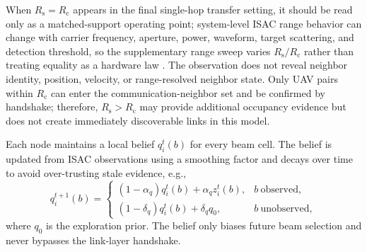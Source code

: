 \documentclass[journal]{IEEEtran}
\newcommand{\Rc}{R_{\mathrm{c}}}
\newcommand{\Rs}{R_{\mathrm{s}}}
\begin{document}
When $\Rs=\Rc$ appears in the final single-hop transfer setting, it should be read only as a matched-support operating point; system-level ISAC range behavior can change with carrier frequency, aperture, power, waveform, target scattering, and detection threshold, so the supplementary range sweep varies $\Rs/\Rc$ rather than treating equality as a hardware law \cite{Bomfin2024SystemISAC}.
The observation does not reveal neighbor identity, position, velocity, or range-resolved neighbor state.
Only UAV pairs within $\Rc$ can enter the communication-neighbor set and be confirmed by handshake; therefore, $\Rs>\Rc$ may provide additional occupancy evidence but does not create immediately discoverable links in this model.

Each node maintains a local belief $q_i^t(b)$ for every beam cell.
The belief is updated from ISAC observations using a smoothing factor and decays over time to avoid over-trusting stale evidence, e.g.,
\begin{equation}
  q_i^{t+1}(b)=
  \begin{cases}
    (1-\alpha_q)q_i^t(b)+\alpha_q z_i^t(b), & b\ \mathrm{observed},\\
    (1-\delta_q)q_i^t(b)+\delta_q q_0, & b\ \mathrm{unobserved},
  \end{cases}
  \label{eq:belief_update}
\end{equation}
where $q_0$ is the exploration prior.
The belief only biases future beam selection and never bypasses the link-layer handshake.
\end{document}
